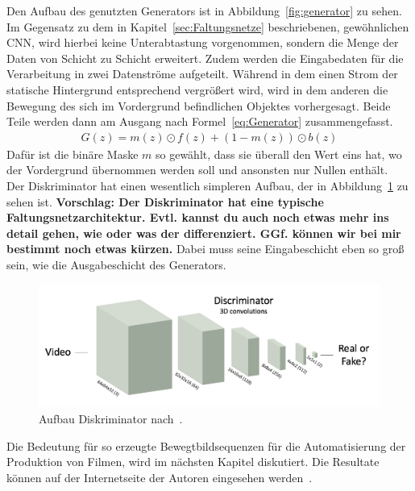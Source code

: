 \documentclass[times, 11pt,twocolumn]{article}
\begin{document}
Den Aufbau des genutzten Generators \cite{VondrickPT16} ist in Abbildung~\ref{fig:generator} zu sehen. Im Gegensatz zu dem in Kapitel~\ref{sec:Faltungsnetze} beschriebenen, gewöhnlichen CNN, wird hierbei keine Unterabtastung vorgenommen, sondern die Menge der Daten von Schicht zu Schicht erweitert. Zudem werden die Eingabedaten für die Verarbeitung in zwei Datenströme aufgeteilt. Während in dem einen Strom der statische Hintergrund entsprechend vergrößert wird, wird in dem anderen die Bewegung des sich im Vordergrund befindlichen Objektes vorhergesagt. Beide Teile werden dann am Ausgang nach Formel~\ref{eq:Generator} zusammengefasst.
\footnotesize
\begin{equation}
\begin{aligned}
G(z) = m(z) \odot f(z) + (1-m(z))\odot b(z)
\end{aligned}
	\label{eq:Generator}
\end{equation}
\small
Dafür ist die binäre Maske $m$ so gewählt, dass sie überall den Wert eins hat, wo der Vordergrund übernommen werden soll und ansonsten nur Nullen enthält. \\
Der Diskriminator hat einen wesentlich simpleren Aufbau, der in Abbildung~\ref{fig:discriminator} zu sehen ist. \textbf{Vorschlag: Der Diskriminator hat eine typische Faltungsnetzarchitektur. Evtl. kannst du auch noch etwas mehr ins detail gehen, wie oder was der differenziert. GGf. können wir bei mir bestimmt noch etwas kürzen.} Dabei muss seine Eingabeschicht eben so groß sein, wie die Ausgabeschicht des Generators.\\
\begin{figure}
	\flushleft
	\includegraphics[width=\columnwidth]{Bilder/discriminator.jpg}
	\caption{Aufbau Diskriminator nach~\cite{VondrickPT16}.}
	\label{fig:discriminator}
\end{figure}
Die Bedeutung für so erzeugte Bewegtbildsequenzen für die Automatisierung der Produktion von Filmen, wird im nächsten Kapitel diskutiert. Die Resultate können auf der Internetseite der Autoren eingesehen werden~\cite{VondrickInternet}.
\end{document}
